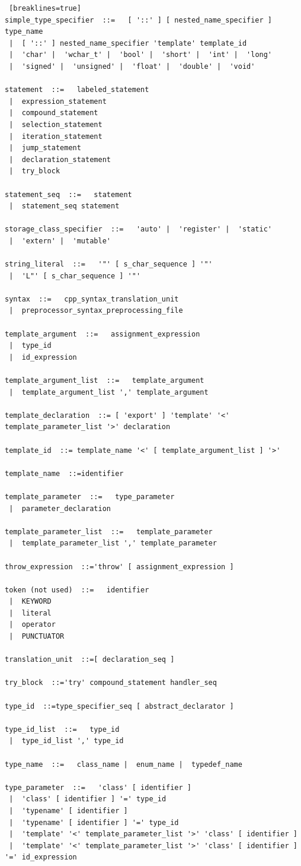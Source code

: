 \documentclass[11pt]{book}
\begin{document}
\begin{lstlisting} [breaklines=true]
simple_type_specifier  ::=   [ '::' ] [ nested_name_specifier ] type_name
 |  [ '::' ] nested_name_specifier 'template' template_id
 |  'char' |  'wchar_t' |  'bool' |  'short' |  'int' |  'long'
 |  'signed' |  'unsigned' |  'float' |  'double' |  'void'

statement  ::=   labeled_statement
 |  expression_statement
 |  compound_statement
 |  selection_statement
 |  iteration_statement
 |  jump_statement
 |  declaration_statement
 |  try_block

statement_seq  ::=   statement
 |  statement_seq statement

storage_class_specifier  ::=   'auto' |  'register' |  'static'
 |  'extern' |  'mutable'
 
string_literal  ::=   '"' [ s_char_sequence ] '"'
 |  'L"' [ s_char_sequence ] '"'

syntax  ::=   cpp_syntax_translation_unit
 |  preprocessor_syntax_preprocessing_file

template_argument  ::=   assignment_expression
 |  type_id
 |  id_expression

template_argument_list  ::=   template_argument
 |  template_argument_list ',' template_argument

template_declaration  ::= [ 'export' ] 'template' '<' template_parameter_list '>' declaration

template_id  ::= template_name '<' [ template_argument_list ] '>'

template_name  ::=identifier

template_parameter  ::=   type_parameter
 |  parameter_declaration

template_parameter_list  ::=   template_parameter
 |  template_parameter_list ',' template_parameter

throw_expression  ::='throw' [ assignment_expression ]

token (not used)  ::=   identifier
 |  KEYWORD
 |  literal
 |  operator
 |  PUNCTUATOR

translation_unit  ::=[ declaration_seq ]

try_block  ::='try' compound_statement handler_seq

type_id  ::=type_specifier_seq [ abstract_declarator ]

type_id_list  ::=   type_id
 |  type_id_list ',' type_id

type_name  ::=   class_name |  enum_name |  typedef_name

type_parameter  ::=   'class' [ identifier ]
 |  'class' [ identifier ] '=' type_id
 |  'typename' [ identifier ]
 |  'typename' [ identifier ] '=' type_id
 |  'template' '<' template_parameter_list '>' 'class' [ identifier ]
 |  'template' '<' template_parameter_list '>' 'class' [ identifier ] '=' id_expression


\end{lstlisting}
\end{document}
